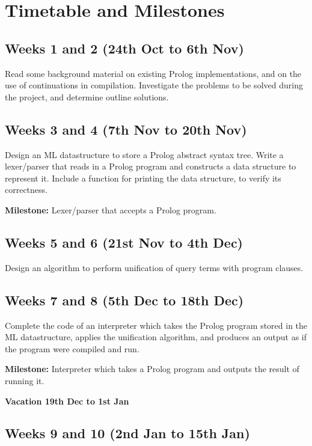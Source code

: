 \documentclass[12pt]{article}
\begin{document}
\section*{Timetable and Milestones}

\subsection*{Weeks 1 and 2 (24th Oct to 6th Nov)}

Read some background material on existing Prolog implementations, and on the use of continuations in compilation. Investigate the problems to be solved during the project, and determine outline solutions.

\subsection*{Weeks 3 and 4 (7th Nov to 20th Nov)}

Design an ML datastructure to store a Prolog abstract syntax tree. Write a lexer/parser that reads in a Prolog program and constructs a data structure to represent it. Include a function for printing the data structure, to verify its correctness.

\textbf{Milestone:} Lexer/parser that accepts a Prolog program.

\subsection*{Weeks 5 and 6 (21st Nov to 4th Dec)}

Design an algorithm to perform unification of query terms with program clauses.

\subsection*{Weeks 7 and 8 (5th Dec to 18th Dec)}

Complete the code of an interpreter which takes the Prolog program stored in the ML datastructure, applies the unification algorithm, and produces an output as if the program were compiled and run.

\textbf{Milestone:} Interpreter which takes a Prolog program and outputs the result of running it.

\textbf{Vacation 19th Dec to 1st Jan}

\subsection*{Weeks 9 and 10 (2nd Jan to 15th Jan)}
\end{document}
